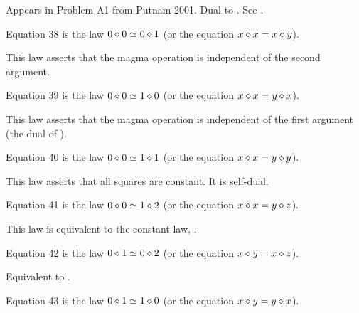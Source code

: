 Appears in Problem A1 from Putnam 2001.  Dual to .  See .

\begin{definition}[Equation 38]\label{eq38}\leanok{}  Equation 38 is the law $0 \diamond 0  \simeq  0 \diamond 1$ (or the equation $x \diamond x = x \diamond y$).
\end{definition}

This law asserts that the magma operation is independent of the second argument.

\begin{definition}[Equation 39]\label{eq39}\leanok{}  Equation 39 is the law $0 \diamond 0  \simeq  1 \diamond 0$ (or the equation $x \diamond x = y \diamond x$).
\end{definition}

This law asserts that the magma operation is independent of the first argument (the dual of ).

\begin{definition}[Equation 40]\label{eq40}\leanok{}  Equation 40 is the law $0 \diamond 0  \simeq  1 \diamond 1$ (or the equation $x \diamond x = y \diamond y$).
\end{definition}

This law asserts that all squares are constant. It is self-dual.

\begin{definition}[Equation 41]\label{eq41}\leanok{}  Equation 41 is the law $0 \diamond 0  \simeq  1 \diamond 2$ (or the equation $x \diamond x = y \diamond z$).
\end{definition}

This law is equivalent to the constant law, .

\begin{definition}[Equation 42]\label{eq42}\leanok{}  Equation 42 is the law $0 \diamond 1  \simeq  0 \diamond 2$ (or the equation $x \diamond y = x \diamond z$).
\end{definition}

Equivalent to .

\begin{definition}[Equation 43]\label{eq43}\leanok{}  Equation 43 is the law $0 \diamond 1  \simeq  1 \diamond 0$ (or the equation $x \diamond y = y \diamond x$).
\end{definition}

